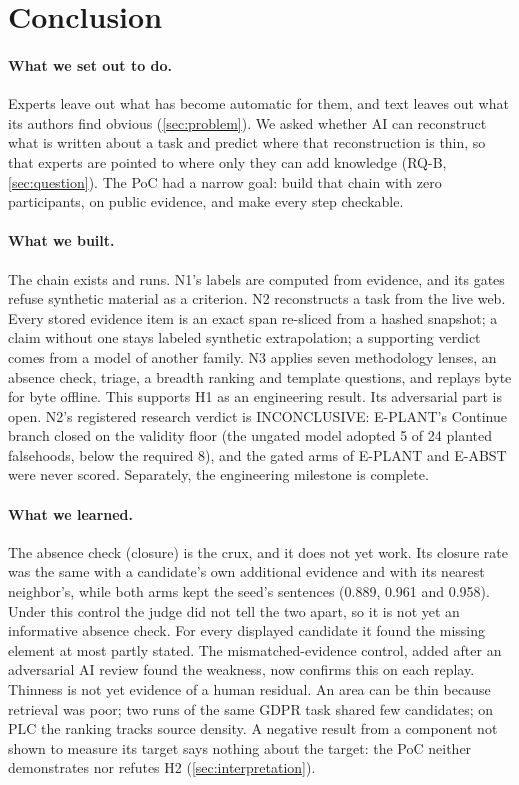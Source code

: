 \section{Conclusion}
\label{sec:conclusion}

\paragraph{What we set out to do.} Experts leave out what has become automatic for them, and text
leaves out what its authors find obvious (\cref{sec:problem}). We asked whether AI can reconstruct
what is written about a task and predict where that reconstruction is thin, so that experts are
pointed to where only they can add knowledge (RQ-B, \cref{sec:question}). The PoC had a narrow goal:
build that chain with zero participants, on public evidence, and make every step checkable.

\paragraph{What we built.} \evobs{} The chain exists and runs. N1's labels are computed from
evidence, and its gates refuse synthetic material as a criterion. N2 reconstructs a task from the
live web. Every stored evidence item is an exact span re-sliced from a hashed snapshot; a claim
without one stays labeled synthetic extrapolation; a supporting verdict comes from a model of another
family. N3 applies seven methodology lenses, an absence check, triage, a breadth ranking and template
questions, and replays byte for byte offline. This supports H1 as an engineering result. Its
adversarial part is open. N2's registered research verdict is INCONCLUSIVE: E-PLANT's Continue branch
closed on the validity floor (the ungated model adopted 5 of 24 planted falsehoods, below the
required 8), and the gated arms of E-PLANT and E-ABST were never scored. Separately, the engineering
milestone is complete.

\paragraph{What we learned.} \evobs{} The absence check (closure) is the crux, and it does not yet
work. Its closure rate was the same with a candidate's own additional evidence and with its nearest
neighbor's, while both arms kept the seed's sentences (0.889, 0.961 and 0.958). Under this control
the judge did not tell the two apart, so it is not yet an informative absence check. For every displayed candidate it found the missing element at
most partly stated. The mismatched-evidence control, added after an adversarial AI review found the weakness, now
confirms this on each replay. \evint{} Thinness is not yet evidence of a human residual. An area can
be thin because retrieval was poor; two runs of the same GDPR task shared few candidates; on PLC the
ranking tracks source density. A negative result from a component not shown to measure its target
says nothing about the target: the PoC neither demonstrates nor refutes H2
(\cref{sec:interpretation}).

